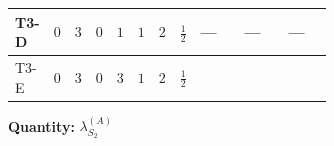 \documentclass[8pt]{article}
\begin{document}
\begin{landscape}
\begin{longtable}{@{}llcccccc >{\raggedright\arraybackslash}p{0.21\linewidth} >{\raggedright\arraybackslash}p{0.21\linewidth} >{\raggedright\arraybackslash}p{0.21\linewidth}@{}}
\midrule
T3-D & $0$ & $3$ & $0$ & $1$ & $1$ & $2$ & $\frac{1}{2}$ & --- & --- & --- \\
\midrule
T3-E & $0$ & $3$ & $0$ & $3$ & $1$ & $2$ & $\frac{1}{2}$ & \scriptsize\adjustbox{max width=\linewidth}{$\begin{gathered} {\lambda_{S_2}^{(1)}} \left(\frac{1}{2} T_{\nu}^{(2)}+13 {\lambda_{S_2}^{(A)}}\right)\end{gathered}$} & \scriptsize\adjustbox{max width=\linewidth}{$\begin{gathered} +4 {\lambda_{S_2}^{(A)}} T_{\nu}^{(2)}\end{gathered}$} & \scriptsize\adjustbox{max width=\linewidth}{$\begin{gathered} -\operatorname{Tr}\!\left({y_2}\,\left({y_2}\right)^{\dagger}\,{y_2}\,\left({y_2}\right)^{\dagger}\right)\end{gathered}$} \\
\midrule
\bottomrule
\end{longtable}
\clearpage
\noindent\textbf{Quantity: }$\lambda_{S_2}^{(A)}$\par\smallskip

\end{landscape}
\end{document}
